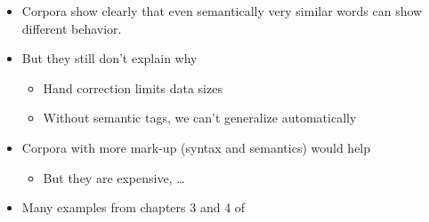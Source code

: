 \documentclass[a4paper,landscape,headrule,footrule,xetex]{foils}
\begin{document}
\MyLogo{}
\begin{itemize}
\item Corpora show clearly that even semantically very similar words
  can show different behavior.
\item But they still don't explain why
  \begin{itemize}
  \item Hand correction limits data sizes
  \item Without semantic tags, we can't generalize automatically
  \end{itemize}
\item Corpora with more mark-up (syntax and semantics) would help
  \begin{itemize}
  \item But they are expensive, \ldots
  \end{itemize}
\end{itemize}


\begin{itemize}
\item Many examples from chapters 3 and 4 of 
\end{itemize}

\end{document}
